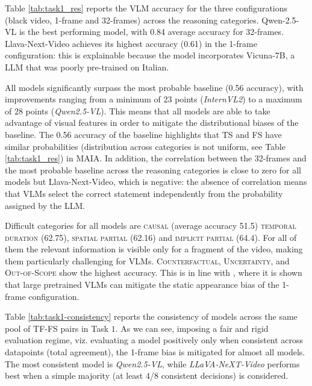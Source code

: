 Table \ref{tab:task1_res} reports the VLM accuracy for the three configurations (black video, 1-frame and 32-frames) across the reasoning categories. Qwen-2.5-VL is the best performing model, with 0.84 average accuracy for 32-frames.  Llava-Next-Video achieves its highest accuracy (0.61) in the 1-frame configuration: this is explainable because the model incorporates Vicuna-7B, a LLM that was poorly pre-trained on Italian.

All models significantly surpass the most probable baseline (0.56 accuracy), with improvements ranging from a minimum of $23$ points (\textit{InternVL2}) to a maximum of $28$ points (\textit{Qwen2.5-VL}). This means that all models are able to take advantage of visual features in order to mitigate the distributional biases of the baseline. The 0.56 accuracy of the baseline highlights that TS and FS have similar probabilities (distribution across categories is not uniform, see Table \ref{tab:task1_res}) in MAIA.
In addition, the correlation between the 32-frames and the most probable baseline across the reasoning categories is close to zero for all models but Llava-Next-Video, which is negative: the absence of correlation means that VLMs select the correct statement independently from the probability assigned by the LLM.

Difficult categories for all models are \textsc{causal} (average accuracy 51.5) \textsc{temporal duration} (62.75), \textsc{spatial partial} (62.16) and 
\textsc{implicit partial} (64.4). For all of them the relevant information is visible only for a fragment of the video, making them particularly challenging for VLMs.
\textsc{Counterfactual}, \textsc{Uncertainty}, and \textsc{Out-of-Scope}  show the highest  accuracy. This is in line with \cite{lei-etal-2023-revealing}, where it is shown that large pretrained VLMs can mitigate the static appearance bias of the 1-frame configuration.

Table \ref{tab:task1-consistency} reports the consistency  of models across the same pool of TF-FS pairs in Task $1$. As we can see, imposing a fair and rigid evaluation regime, viz. evaluating a model positively only when consistent across datapoints (total agreement), the 1-frame bias is mitigated for almost all models. The most consistent model  is \textit{Qwen2.5-VL}, while  \textit{LLaVA-NeXT-Video} performs best when a simple majority (at least $4$/$8$ consistent decisions) is considered. 




